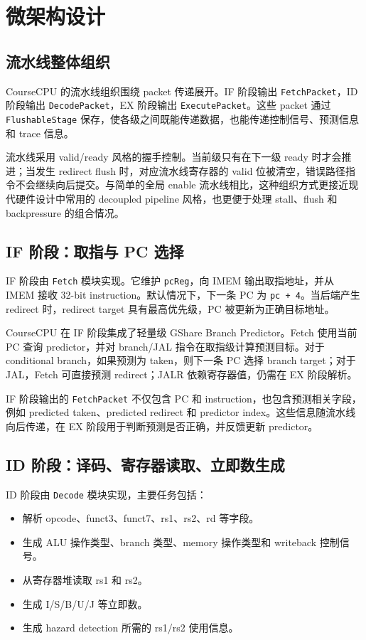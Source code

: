 \documentclass[UTF8,a4paper,12pt]{ctexrep}
\begin{document}
\chapter{微架构设计}

\section{流水线整体组织}

CourseCPU 的流水线组织围绕 packet 传递展开。IF 阶段输出 \texttt{FetchPacket}，ID 阶段输出 \texttt{DecodePacket}，EX 阶段输出 \texttt{ExecutePacket}。这些 packet 通过 \texttt{FlushableStage} 保存，使各级之间既能传递数据，也能传递控制信号、预测信息和 trace 信息。

流水线采用 valid/ready 风格的握手控制。当前级只有在下一级 ready 时才会推进；当发生 redirect flush 时，对应流水线寄存器的 valid 位被清空，错误路径指令不会继续向后提交。与简单的全局 enable 流水线相比，这种组织方式更接近现代硬件设计中常用的 decoupled pipeline 风格，也更便于处理 stall、flush 和 backpressure 的组合情况。

\section{IF 阶段：取指与 PC 选择}

IF 阶段由 \texttt{Fetch} 模块实现。它维护 \texttt{pcReg}，向 IMEM 输出取指地址，并从 IMEM 接收 32-bit instruction。默认情况下，下一条 PC 为 \texttt{pc + 4}。当后端产生 redirect 时，redirect target 具有最高优先级，PC 被更新为正确目标地址。

CourseCPU 在 IF 阶段集成了轻量级 GShare Branch Predictor。Fetch 使用当前 PC 查询 predictor，并对 branch/JAL 指令在取指级计算预测目标。对于 conditional branch，如果预测为 taken，则下一条 PC 选择 branch target；对于 JAL，Fetch 可直接预测 redirect；JALR 依赖寄存器值，仍需在 EX 阶段解析。

IF 阶段输出的 \texttt{FetchPacket} 不仅包含 PC 和 instruction，也包含预测相关字段，例如 predicted taken、predicted redirect 和 predictor index。这些信息随流水线向后传递，在 EX 阶段用于判断预测是否正确，并反馈更新 predictor。

\section{ID 阶段：译码、寄存器读取、立即数生成}

ID 阶段由 \texttt{Decode} 模块实现，主要任务包括：

\begin{itemize}
  \item 解析 opcode、funct3、funct7、rs1、rs2、rd 等字段。
  \item 生成 ALU 操作类型、branch 类型、memory 操作类型和 writeback 控制信号。
  \item 从寄存器堆读取 rs1 和 rs2。
  \item 生成 I/S/B/U/J 等立即数。
  \item 生成 hazard detection 所需的 rs1/rs2 使用信息。
\end{itemize}
\end{document}
